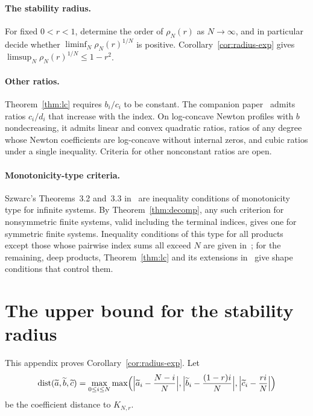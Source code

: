 \paragraph{The stability radius.} For fixed $0<r<1$, determine the order of $\rho_N(r)$ as $N\to\infty$, and in particular decide whether $\liminf_N\rho_N(r)^{1/N}$ is positive. Corollary~\ref{cor:radius-exp} gives $\limsup_N\rho_N(r)^{1/N}\leq1-r^2$.

\paragraph{Other ratios.} Theorem~\ref{thm:lc} requires $b_i/c_i$ to be constant. The companion paper~\cite{P2} admits ratios $c_i/d_i$ that increase with the index. On log-concave Newton profiles with $b$ nondecreasing, it admits linear and convex quadratic ratios, ratios of any degree whose Newton coefficients are log-concave without internal zeros, and cubic ratios under a single inequality. Criteria for other nonconstant ratios are open.

\paragraph{Monotonicity-type criteria.} Szwarc's Theorems~3.2 and~3.3 in~\cite{szwarc} are inequality conditions of monotonicity type for infinite systems. By Theorem~\ref{thm:decomp}, any such criterion for nonsymmetric finite systems, valid including the terminal indices, gives one for symmetric finite systems. Inequality conditions of this type for all products except those whose pairwise index sums all exceed $N$ are given in~\cite{P3}; for the remaining, deep products, Theorem~\ref{thm:lc} and its extensions in~\cite{P2} give shape conditions that control them.

\appendix
\section{The upper bound for the stability radius}\label{app:radius}

This appendix proves Corollary~\ref{cor:radius-exp}. Let
\[
\operatorname{dist}(\widetilde a,\widetilde b,\widetilde c)=\max_{0\leq i\leq N}\max\Bigl(\Bigl|\widetilde a_i-\frac{N-i}N\Bigr|,\Bigl|\widetilde b_i-\frac{(1-r)i}N\Bigr|,\Bigl|\widetilde c_i-\frac{ri}N\Bigr|\Bigr)
\]
be the coefficient distance to $K_{N,r}$.

